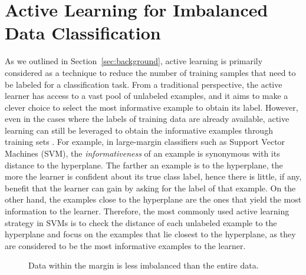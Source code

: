 \section{Active Learning for Imbalanced Data Classification}
\label{al_for_imbalanced_data}
As we outlined in Section~\ref{sec:background}, active learning is primarily considered as a technique to reduce the number of training samples that need to be labeled for a classification task. From a traditional perspective, the active learner has access to a vast pool of unlabeled examples, and it aims to make a clever choice to select the most informative example to obtain its label. However, even in the cases where the labels of training data are already available, active learning can still be leveraged to obtain the informative examples through training sets \cite{Schohn_2000,Bordes_2005,Huang_2006}. For example, in large-margin classifiers such as Support Vector Machines (SVM), the \textit{informativeness} of an example is synonymous with its distance to the hyperplane. The farther an example is to the hyperplane, the more the learner is confident about its true class label, hence there is little, if any, benefit that the learner can gain by asking for the label of that example. On the other hand, the examples close to the hyperplane are the ones that yield the most information to the learner. Therefore, the most commonly used active learning strategy in SVMs is to check the distance of each unlabeled example to the hyperplane and focus on the examples that lie closest to the hyperplane, as they are considered to be the most informative examples to the learner.

\begin{figure}[t!]
    \centering
    \caption{Data within the margin is less imbalanced than the entire data.}
    \label{fig:alimbshade}
\end{figure}

